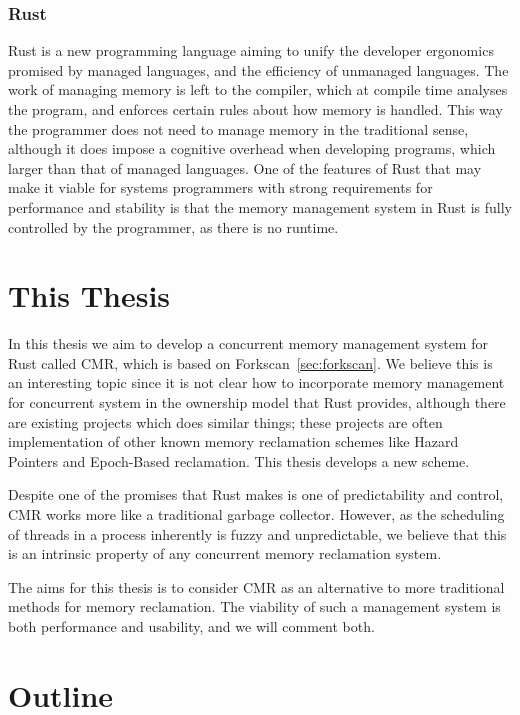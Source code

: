 \subsubsection{Rust}

Rust is a new programming language aiming to unify the developer ergonomics promised by managed
languages, and the efficiency of unmanaged languages. The work of managing memory is left to the
compiler, which at compile time analyses the program, and enforces certain rules about how memory
is handled. This way the programmer does not need to manage memory in the traditional sense,
although it does impose a cognitive overhead when developing programs, which larger than that of managed
languages. One of the features of Rust that may make it viable for systems programmers with strong
requirements for performance and stability is that the memory management system in Rust is fully
controlled by the programmer, as there is no runtime.


\section{This Thesis}

In this thesis we aim to develop a concurrent memory management system for Rust called CMR\@, which
is based on Forkscan~\ref{sec:forkscan}. We believe this is an interesting topic since it is not
clear how to incorporate memory management for concurrent system in the ownership model that Rust
provides, although there are existing projects which does similar things; these projects are often
implementation of other known memory reclamation schemes like Hazard Pointers and Epoch-Based
reclamation. This thesis develops a new scheme.

Despite one of the promises that Rust makes is one of predictability and control, CMR works more
like a traditional garbage collector. However, as the scheduling of threads in a process inherently
is fuzzy and unpredictable, we believe that this is an intrinsic property of any concurrent memory
reclamation system.

The aims for this thesis is to consider CMR as an alternative to more traditional methods for
memory reclamation. The viability of such a management system is both performance and usability,
and we will comment both.


\section{Outline}

